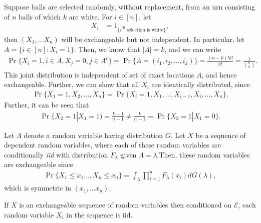 \documentclass[a4paper,10pt,english]{article}
\begin{document}
\begin{exmp}
Suppose balls are selected randomly, without replacement, from an urn consisting of $n$ balls of which $k$ are white. For $i \in [n]$, let
\begin{align*}
   X_i &= 1_{\{ i^{\text{th}}\text{ selection is white}\}},
\end{align*}
then $(X_1, \ldots X_n)$ will be exchangeable but not independent.  
In particular, let $A = \{ i \in [n]: X_i = 1\}$. Then, we know that $|A| = k$, and we can write 
\begin{align*}
\Pr\{X_i = 1, i \in A, X_j = 0, j \in A^c\} = \Pr\{A = (i_1, i_2, \ldots, i_k) \} = \frac{(n-k)!k!}{n!} = \frac{1}{\binom{n}{k}}.
\end{align*}
This joint distribution is independent of set of exact locations $A$, and hence exchangeable. 
Further, we can show that all $X_i$ are identically distributed, since
\begin{align*}
\Pr\{X_1= 1, X_2, \ldots, X_n\} = \Pr\{X_i = 1, X_1, \ldots, X_{i-1}, X_i, \ldots, X_n\}. 
\end{align*}
Further, it can be seen that
\begin{align*}
\Pr\{X_2 = 1|X_1= 1) = \frac{k-1}{n-1} \neq \frac{k}{n-1} = \Pr\{X_2 = 1|X_1 =0\}.
\end{align*}
\end{exmp}
\begin{exmp}
Let $\Lambda$ denote a random variable having distribution $G$. Let $X$ be a sequence of dependent random variables, where each of these random variables are conditionally \textit{iid} with distribution $F_\lambda$ given $\Lambda= \lambda$.Then, these random variables are exchangeable since
\begin{align*}
\Pr\{X_1 \leq x_1 \ldots , X_n \leq x_n\} = \int_{\lambda} \prod_{i=1}^nF_\lambda(x_i)dG(\lambda),
\end{align*}
which is symmetric in $(x_1, \ldots x_n)$. %
\end{exmp}
\begin{thm} If $X$ is an exchangeable sequence of random variables then conditioned on $\mathcal{E}$, each random variable $X_i$ in the sequence is iid.
\end{thm}
\end{document}
